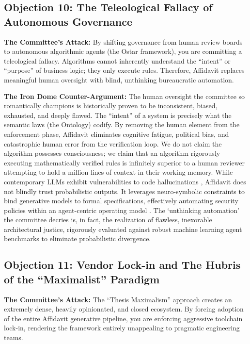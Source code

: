 \subsection{Objection 10: The Teleological Fallacy of Autonomous Governance}
\textbf{The Committee's Attack:} By shifting governance from human review boards to autonomous algorithmic agents (the Ostar framework), you are committing a teleological fallacy. Algorithms cannot inherently understand the ``intent'' or ``purpose'' of business logic; they only execute rules. Therefore, Affidavit replaces meaningful human oversight with blind, unthinking bureaucratic automation.

\textbf{The Iron Dome Counter-Argument:} The human oversight the committee so romantically champions is historically proven to be inconsistent, biased, exhausted, and deeply flawed. The ``intent'' of a system is precisely what the semantic laws (the Ontology) codify. By removing the human element from the enforcement phase, Affidavit eliminates cognitive fatigue, political bias, and catastrophic human error from the verification loop. We do not claim the algorithm possesses consciousness; we claim that an algorithm rigorously executing mathematically verified rules is infinitely superior to a human reviewer attempting to hold a million lines of context in their working memory. While contemporary LLMs exhibit vulnerabilities to code hallucinations \cite{ref_ExploringandEva56, ref_CodeHaluInvesti59}, Affidavit does not blindly trust probabilistic outputs. It leverages neuro-symbolic constraints \cite{ref_FastandAccurate62} to bind generative models to formal specifications, effectively automating security policies \cite{ref_OnAutomatingSec61} within an agent-centric operating model \cite{ref_AgentCentricOpe63}. The `unthinking automation' the committee decries is, in fact, the realization of flawless, inexorable architectural justice, rigorously evaluated against robust machine learning agent benchmarks \cite{ref_MLEbenchEvaluat58} to eliminate probabilistic divergence.

\subsection{Objection 11: Vendor Lock-in and The Hubris of the ``Maximalist'' Paradigm}
\textbf{The Committee's Attack:} The ``Thesis Maximalism'' approach creates an extremely dense, heavily opinionated, and closed ecosystem. By forcing adoption of the entire Affidavit generative pipeline, you are enforcing aggressive toolchain lock-in, rendering the framework entirely unappealing to pragmatic engineering teams.


